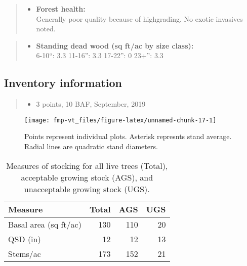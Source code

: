 \documentclass[]{tufte-handout}
\providecommand{\tightlist}{%
  \setlength{\itemsep}{0pt}\setlength{\parskip}{0pt}}
\begin{document}
\begin{quote}
\begin{itemize}
\tightlist
\item
  \textbf{Forest health:}\\
  \vspace{2pt} Generally poor quality because of highgrading. No exotic
  invasives noted.
\end{itemize}
\end{quote}

\begin{quote}
\begin{itemize}
\tightlist
\item
  \textbf{Standing dead wood (sq ft/ac by size class):}\\
  \vspace{2pt} \indent \small 6-10``: 3.3 \textbar{} 11-16'': 3.3
  \textbar{} 17-22'': 0 \textbar{} 23+'': 3.3
\end{itemize}
\end{quote}

\subsection{Inventory information}\label{inventory-information-2}

\begin{quote}
\begin{itemize}
\tightlist
\item
  3 points, 10 BAF, September, 2019
\end{itemize}
\end{quote}

\begin{figure}
\texttt{[image: fmp-vt\_files/figure-latex/unnamed-chunk-17-1]} \caption[Points represent individual plots]{Points represent individual plots. Asterisk represnts stand average. Radial lines are quadratic stand diameters.}\label{fig:unnamed-chunk-17}
\end{figure}

\begin{table}

\caption{\label{tab:unnamed-chunk-18}Measures of stocking for all live trees (Total), acceptable growing stock (AGS), and unacceptable growing stock (UGS).}
\centering
\begin{tabular}[t]{lrrr}
\toprule
Measure & Total & AGS & UGS\\
\midrule
Basal area (sq ft/ac) & 130 & 110 & 20\\
QSD (in) & 12 & 12 & 13\\
Stems/ac & 173 & 152 & 21\\
\bottomrule
\end{tabular}
\end{table}
\end{document}
